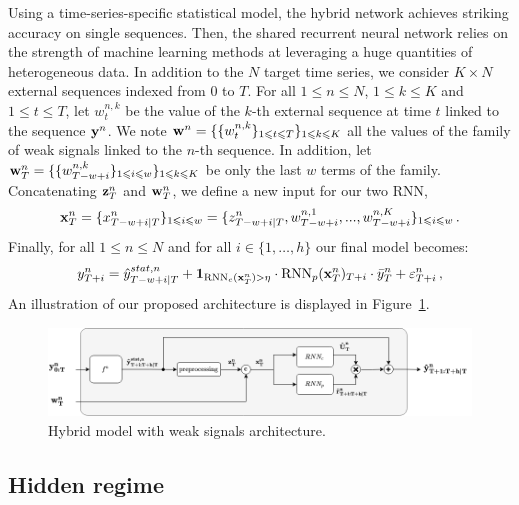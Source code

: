 \documentclass{article} %
\newcommand{\ts}{y}
\newcommand{\fullts}{{\bf \ts}}
\newcommand{\tspred}{\hat{\ts}}
\newcommand{\lag}{h}
\newcommand{\window}{w}
\newcommand{\meants}{\Bar{\ts}}
\newcommand{\rnnwindow}{{\bf \rnn}}
\newcommand{\rnn}{z}
\newcommand{\rnnmodel}{\textsc{rnn}}
\newcommand{\ws}{w}
\newcommand{\fullws}{{\bf \ws}}
\newcommand{\concatinput}{x}
\newcommand{\fullconcatinput}{{ \bf \concatinput}}
\newcommand{\threshold}{\eta}
\newcommand{\predictor}{\mathrm{RNN}_p}
\newcommand{\classifier}{\mathrm{RNN}_c}
\begin{document}
Using a time-series-specific statistical model, the hybrid network achieves striking accuracy on single sequences. Then, the shared recurrent neural network relies on the strength of machine learning methods at leveraging a huge quantities of heterogeneous data.
In addition to the $N$ target time series, we consider $K \times N$ external sequences indexed from $0$ to $T$. For all $1\leqslant n \leqslant N$, $1\leqslant k \leqslant K$ and  $1\leqslant t \leqslant T$, let $\ws^{n,k}_t$ be the value of the $k$-th external sequence at time $t$ linked to the sequence $\fullts^n$. We note $\fullws^n = \{\{\ws_t^{n,k}\}_{1\leqslant t \leqslant T}\}_{1\leqslant k \leqslant K}$ all the values of the family of weak signals linked to the $n$-th sequence. In addition, let $\fullws^n_T = \{\{\ws_{T-w+i}^{n,k}\}_{1\leqslant i \leqslant \window}\}_{1\leqslant k \leqslant K}$ be only the last $\window$ terms of the family. Concatenating $ \rnnwindow^n_T$ and $\fullws^n_T$, we define a new input for our two RNN,   
$$
\fullconcatinput^n_T = \{\concatinput^n_{T-w+i|T}\}_{1\leqslant i \leqslant w}= \{\rnn^n_{T-w+i|T}, \ws^{n,1}_{T-w+i},...,\ws^{n,K}_{T-w+i}\}_{1\leqslant i \leqslant w}\,.
$$
Finally, for all $1\leqslant n \leqslant N$ and for all $i \in \{1,\ldots,\lag\}$ our final model becomes:
\begin{equation}
\label{eq:full:model}
\ts^n_{T+i}  = \tspred^{stat,n}_{T-w+i|T} +  \mathbf{1}_{\classifier(\fullconcatinput^n_T) > \threshold} \cdot \predictor(\fullconcatinput^n_T)_{T+i} \cdot \meants^n_T + \varepsilon^n_{T+i}\,,
\end{equation}
An illustration of our proposed architecture is displayed in Figure~\ref{fig:architecture}.

\begin{figure}
  \centering
    \includegraphics[width=1\linewidth]{figure/Regime_switching_recurrent_model}
  \caption{Hybrid model with weak signals architecture.}
\label{fig:architecture}
\end{figure}


\subsection{Hidden regime}
\end{document}
